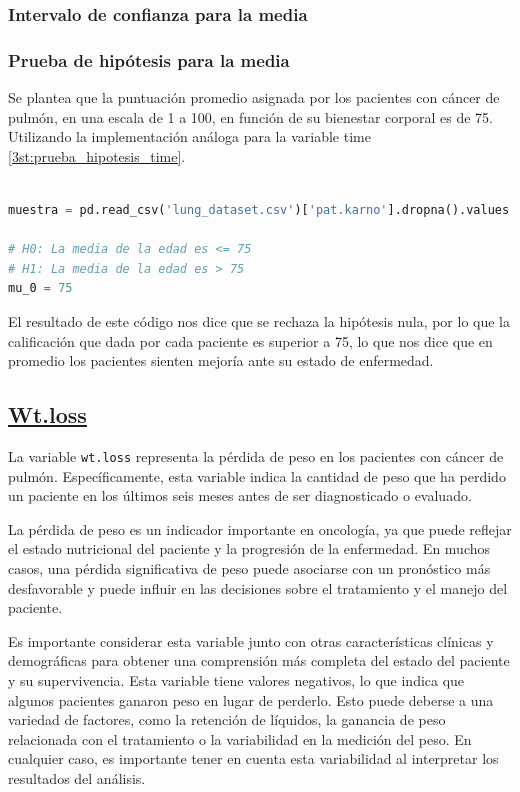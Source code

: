 \documentclass[a4paper,12pt]{article}
\begin{document}
    \subsubsection*{Intervalo de confianza para la media}

    \subsubsection*{Prueba de hipótesis para la media}

    Se plantea que la puntuación promedio asignada por los pacientes con cáncer de pulmón, en una escala de 1 a 100, en función de su bienestar corporal es de 75. Utilizando la implementación análoga para la variable time  \ref{3st:prueba_hipotesis_time}.

    \begin{lstlisting}[language=Python, caption={Código en Python para calcular el estimador de la prueba de hipotesis},label={3st:prueba_hipotesis_pat.karno}]
        
muestra = pd.read_csv('lung_dataset.csv')['pat.karno'].dropna().values

# H0: La media de la edad es <= 75
# H1: La media de la edad es > 75
mu_0 = 75  

    \end{lstlisting}

 El resultado de este código nos dice que se rechaza la hipótesis nula, por lo que la calificación que dada por cada paciente es superior a 75, lo que nos dice que en promedio los pacientes sienten mejoría ante su estado de enfermedad.

    \subsection*{\underline{Wt.loss}}

    La variable \texttt{wt.loss} representa la pérdida de peso en los pacientes con cáncer de pulmón. Específicamente, esta variable indica la cantidad de peso que ha perdido un paciente en los últimos seis meses antes de ser diagnosticado o evaluado.

La pérdida de peso es un indicador importante en oncología, ya que puede reflejar el estado nutricional del paciente y la progresión de la enfermedad. En muchos casos, una pérdida significativa de peso puede asociarse con un pronóstico más desfavorable y puede influir en las decisiones sobre el tratamiento y el manejo del paciente.

Es importante considerar esta variable junto con otras características clínicas y demográficas para obtener una comprensión más completa del estado del paciente y su supervivencia.
Esta variable tiene valores negativos, lo que indica que algunos pacientes ganaron peso en lugar de perderlo. Esto puede deberse a una variedad de factores, como la retención de líquidos, la ganancia de peso relacionada con el tratamiento o la variabilidad en la medición del peso. En cualquier caso, es importante tener en cuenta esta variabilidad al interpretar los resultados del análisis.
\end{document}
